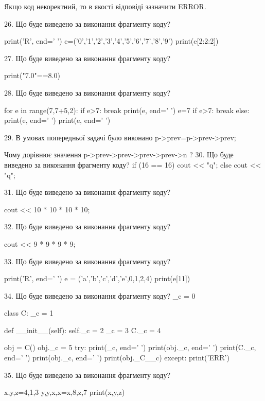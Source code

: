 \documentclass[11pt]{article}
\begin{document}
Якщо код некоректний, то в якості відповіді зазначити ERROR.



26. Що буде виведено за виконання фрагменту коду?

print('R', end=' ')
e=('0','1','2','3','4','5','6','7','8','9')
print(e[2:2:2])


27. Що буде виведено за виконання фрагменту коду?

print("7.0"==8.0)

28. Що буде виведено за виконання фрагменту коду?

for e in range(7,7+5,2):
    if e>7:
        break
    print(e, end=' ')
    e=7
    if e>7:
        break
else:
    print(e, end=' ')
print(e, end=' ')

29. 
В умовах попередньої задачі було виконано p->prev=p->prev->prev;

Чому дорівнює значення p->prev->prev->prev->prev->n ?
30. Що буде виведено за виконання фрагменту коду?
if (16 == 16)
    cout << "q";
else
    cout << "q";


31. Що буде виведено за виконання фрагменту коду?

cout << 10 * 10 * 10 * 10;

32. Що буде виведено за виконання фрагменту коду?

cout << 9 * 9 * 9 * 9;

33. Що буде виведено за виконання фрагменту коду?

print('R', end=' ')
e = ('a','b','c','d','e',0,1,2,4)
print(e[11])


34. Що буде виведено за виконання фрагменту коду?
_c = 0

class C:
    _c = 1
    
    def __init__(self):
        self._c = 2
        _c = 3
        C._c = 4

obj = C()
obj._c = 5
try:
    print(_c, end=' ')
    print(obj._c, end=' ')
    print(C._c, end=' ')
    print(obj._c, end=' ')
    print(obj._C__c)
except:
    print('ERR')

35. Що буде виведено за виконання фрагменту коду?

x,y,z=4,1,3
y,y,x,x=x,8,z,7
print(x,y,z)
\end{document}
